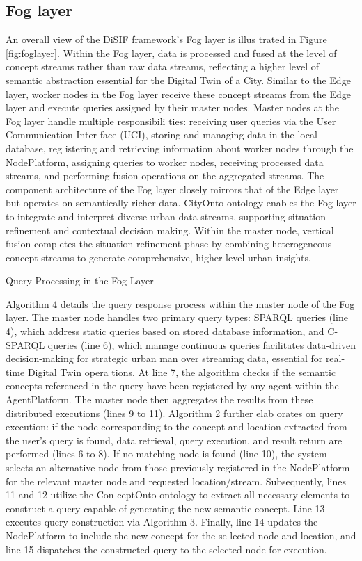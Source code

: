\documentclass[5p,times]{elsarticle}
\begin{document}
\subsection{Fog layer}

An overall view of the DiSIF framework’s Fog layer is illus
trated in Figure  \ref{fig:foglayer}. Within the Fog layer, data is processed and
 fused at the level of concept streams rather than raw data streams,
 reflecting a higher level of semantic abstraction essential for the
 Digital Twin of a City. Similar to the Edge layer, worker nodes
 in the Fog layer receive these concept streams from the Edge
 layer and execute queries assigned by their master nodes.
 Master nodes at the Fog layer handle multiple responsibili
ties: receiving user queries via the User Communication Inter
face (UCI), storing and managing data in the local database, reg
istering and retrieving information about worker nodes through
 the NodePlatform, assigning queries to worker nodes, receiving
 processed data streams, and performing fusion operations on the
 aggregated streams.
 The component architecture of the Fog layer closely mirrors
 that of the Edge layer but operates on semantically richer data.
 CityOnto ontology enables the Fog layer to integrate and interpret diverse urban data
 streams, supporting situation refinement and contextual decision
making. Within the master node, vertical fusion completes the
 situation refinement phase by combining heterogeneous concept
 streams to generate comprehensive, higher-level urban insights.


 Query Processing in the Fog Layer

 Algorithm 4 details the query response process within the
 master node of the Fog layer. The master node handles two
 primary query types: 
 SPARQL queries (line 4), which address
  static queries based on stored database information, and C-SPARQL queries (line 6), which manage continuous queries
facilitates data-driven decision-making for strategic urban man
over streaming data, essential for real-time Digital Twin opera
tions. At line 7, the algorithm checks if the semantic concepts
referenced in the query have been registered by any agent within
the AgentPlatform. The master node then aggregates the results from these
distributed executions (lines 9 to 11).
Algorithm 2 further elab
orates on query execution: if the node corresponding to the
concept and location extracted from the user’s query is found,
data retrieval, query execution, and result return are performed
(lines 6 to 8). If no matching node is found (line 10), the system
selects an alternative node from those previously registered in
the NodePlatform for the relevant master node and requested
location/stream. Subsequently, lines 11 and 12 utilize the Con
ceptOnto ontology to extract all necessary elements to construct
a query capable of generating the new semantic concept. Line
13 executes query construction via Algorithm 3. Finally, line 14
updates the NodePlatform to include the new concept for the se
lected node and location, and line 15 dispatches the constructed
query to the selected node for execution.
\end{document}
